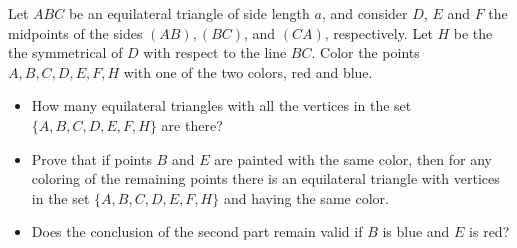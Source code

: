 Let $ABC$ be an equilateral triangle of side length $a$, and consider $D$, $E$ and $F$ the midpoints of the sides $(AB), (BC)$, and $(CA)$, respectively. Let $H$ be the the symmetrical of $D$ with respect to the line $BC$. Color the points $A, B, C, D, E, F, H$ with one of the two colors, red and blue.
\begin{itemize}
	\item How many equilateral triangles with all the vertices in the set $\{A, B, C, D, E, F, H\}$ are there?
	\item Prove that if points $B$ and $E$ are painted with the same color, then for any coloring of the remaining points there is an equilateral triangle with vertices in the set $\{A, B, C, D, E, F, H\}$ and having the same color.
	\item Does the conclusion of the second part remain valid if $B$ is blue and $E$ is red?
\end{itemize}
